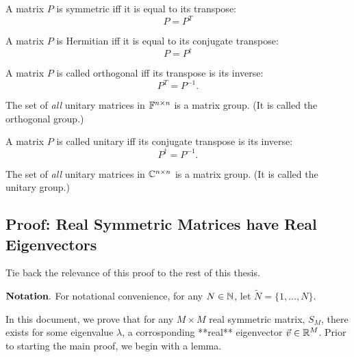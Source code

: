 \begin{definition}
A matrix $P$ is symmetric iff it is equal to its transpose:
$$ P = P^{T}$$
\end{definition}

\begin{definition}
A matrix $P$ is Hermitian iff it is equal to its conjugate transpose:
$$ P = P^{\dagger}$$
\end{definition}

\begin{definition}
A matrix $P$ is called orthogonal iff its transpose is its inverse:
$$ P^{T}=P^{-1}. $$
\end{definition}

\begin{theorem}
The set of {\em all} unitary matrices in $\mathbb{F}^{n\times n}$ is a matrix group. (It is called the {orthogonal group}.)
\end{theorem}

\begin{definition}
A matrix $P$ is called unitary iff its conjugate transpose is its inverse:
$$ P^{\dagger}=P^{-1}. $$
\end{definition}

\begin{theorem}
The set of {\em all} unitary matrices in $\mathbb{C}^{n\times n}$ is a matrix group. (It is called the {unitary group}.)
\end{theorem}


\newpage

\subsection{Proof: Real Symmetric Matrices have Real Eigenvectors}


Tie back the relevance of this proof to the rest of this thesis.



$\bf Notation.$ For notational convenience, for any $N \in \mathbb{N}$, let $\widetilde{N} = \{1,\dots,N\}$.

In this document, we prove that for any $M \times M$ real symmetric matrix, $S_M$, there exists for some eigenvalue $\lambda$, a corrosponding **real** eigenvector $\vec{v} \in \mathbb{R}^M$. Prior to starting the main proof, we begin with a lemma.

